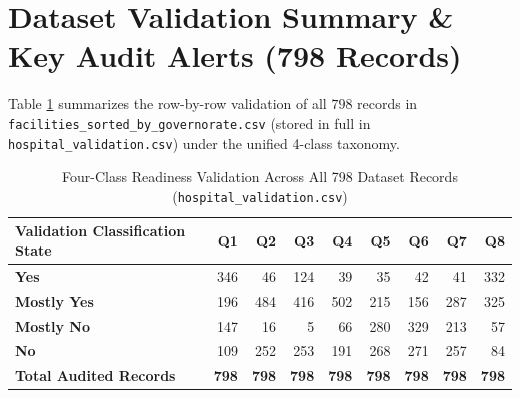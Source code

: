 \documentclass[10pt,a4paper]{article}
\begin{document}
\section{Dataset Validation Summary \& Key Audit Alerts (798 Records)}

Table \ref{tab:summary_brief} summarizes the row-by-row validation of all $798$ records in \texttt{facilities\_sorted\_by\_governorate.csv} (stored in full in \texttt{hospital\_validation.csv}) under the unified 4-class taxonomy.

{\footnotesize
\begin{table}[ht!]
\centering
\caption{Four-Class Readiness Validation Across All 798 Dataset Records (\texttt{hospital\_validation.csv})}
\label{tab:summary_brief}
\begin{tabular}{l r r r r r r r r}
\toprule
\textbf{Validation Classification State} & \textbf{Q1} & \textbf{Q2} & \textbf{Q3} & \textbf{Q4} & \textbf{Q5} & \textbf{Q6} & \textbf{Q7} & \textbf{Q8} \\
\midrule
\textbf{Yes} & 346 & 46 & 124 & 39 & 35 & 42 & 41 & 332 \\
\textbf{Mostly Yes} & 196 & 484 & 416 & 502 & 215 & 156 & 287 & 325 \\
\textbf{Mostly No} & 147 & 16 & 5 & 66 & 280 & 329 & 213 & 57 \\
\textbf{No} & 109 & 252 & 253 & 191 & 268 & 271 & 257 & 84 \\
\midrule
\textbf{Total Audited Records} & \textbf{798} & \textbf{798} & \textbf{798} & \textbf{798} & \textbf{798} & \textbf{798} & \textbf{798} & \textbf{798} \\
\bottomrule
\end{tabular}
\end{table}
}
\end{document}
